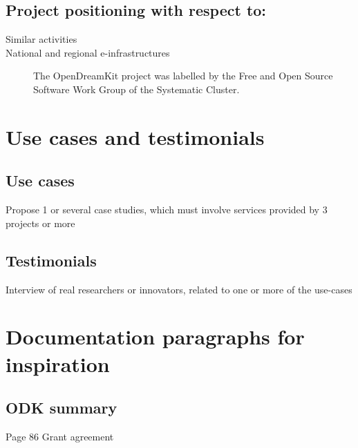 \documentclass[12pta4wide]{amsart}
\begin{document}
\subsection{Project positioning with respect to:}
\begin{description}
\item[Similar activities]
\item[National and regional e-infrastructures]
The OpenDreamKit project was labelled by the Free and Open Source Software Work Group of the Systematic Cluster.

\end{description}

\section{Use cases and testimonials}
\subsection{Use cases}
Propose 1 or several case studies, which must involve services provided by 3 projects or more
\subsection{Testimonials}
Interview of real researchers or innovators, related to one or more of the use-cases


\section{Documentation paragraphs for inspiration}
\subsection{ODK summary}
Page 86 Grant agreement
\end{document}
